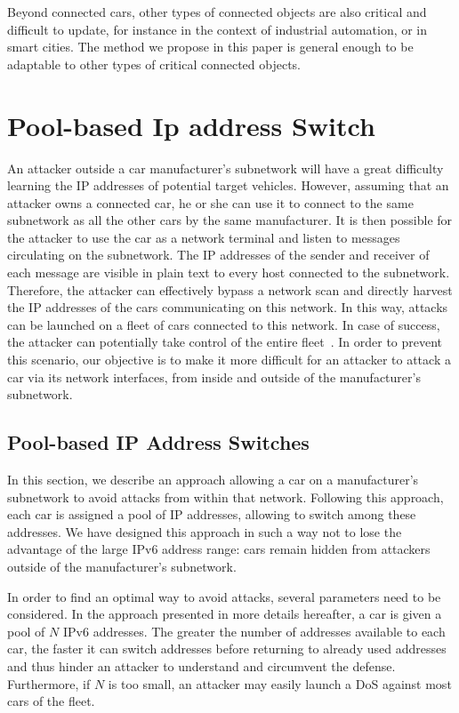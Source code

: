 Beyond connected cars, other types of connected objects are also
critical and difficult to update, for instance in the context of
industrial automation, or in smart cities. The method we propose in this paper
is general enough to be adaptable to other types of critical
connected objects.




\section {Pool-based Ip address Switch}

{\Huge A}n attacker outside a
car manufacturer's subnetwork will have a great difficulty learning
the IP addresses of potential target vehicles. However, assuming that
an attacker owns a connected car, he or she can use it to connect to
the same subnetwork as all the other cars by the same manufacturer. It
is then possible for the attacker to use the car as a network terminal
and listen to messages circulating on the subnetwork. The IP addresses
of the sender and receiver of each message are visible in plain text
to every host connected to the subnetwork. Therefore, the attacker can
effectively bypass a network scan and directly harvest the IP
addresses of the cars communicating on this network. In this way,
attacks can be launched on a fleet of cars connected to this
network. In case of success, the attacker can potentially take control
of the entire fleet~\cite{valasek_adventures}.  In order to prevent this
scenario, our objective is to make it more difficult for an attacker
to attack a car via its network interfaces, from inside and outside of
the manufacturer's subnetwork.

\subsection{ Pool-based IP Address Switches}

\label{sec:pool_based_ip}

In this section, we describe an approach allowing a car on a
manufacturer's subnetwork to avoid attacks from within that
network. Following this approach, each car is assigned a pool of IP
addresses, allowing to switch among these addresses. We have designed
this approach in such a way not to lose the advantage of the large
IPv6 address range: cars remain hidden from attackers outside of the
manufacturer's subnetwork.

In order to find an optimal way to avoid attacks, several parameters
need to be considered. In the approach presented in more details
hereafter, a car is given a pool of $N$ IPv6 addresses. The greater
the number of addresses available to each car, the faster it can
switch addresses before returning to already used addresses and thus
hinder an attacker to understand and circumvent the defense.
Furthermore, if $N$ is too small, an attacker may easily launch a DoS
against most cars of the fleet.

